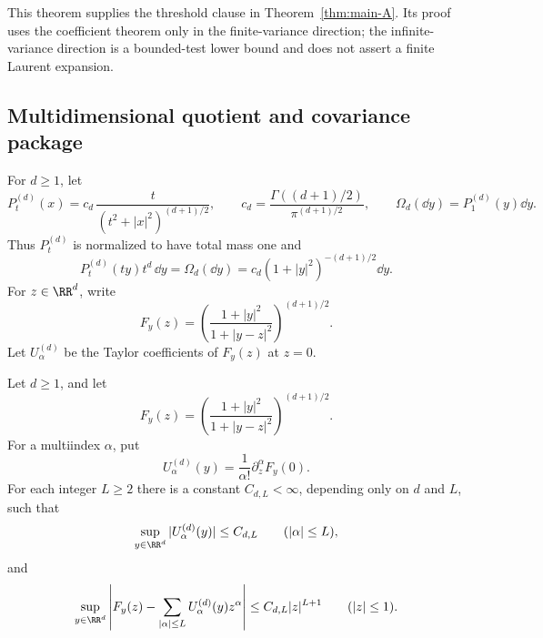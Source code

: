 \begin{remark}
This theorem supplies the threshold clause in Theorem~\ref{thm:main-A}.
Its proof uses the coefficient theorem only in the finite-variance direction;
the infinite-variance direction is a bounded-test lower bound and does not
assert a finite Laurent expansion.
\end{remark}

\subsection{Multidimensional quotient and covariance package}

For \(d\ge1\), let
\[
P_t^{(d)}(x)=c_d\,\frac{t}{(t^2+|x|^2)^{(d+1)/2}},
\qquad
c_d=\frac{\Gamma((d+1)/2)}{\pi^{(d+1)/2}},
\qquad
\Omega_d(\dd y)=P_1^{(d)}(y)\dd y.
\]
Thus \(P_t^{(d)}\) is normalized to have total mass one and
\[
P_t^{(d)}(ty)t^d\,\dd y=\Omega_d(\dd y)
=c_d(1+|y|^2)^{-(d+1)/2}\dd y .
\]
For \(z\in\RR^d\), write
\[
F_y(z)=\left(\frac{1+|y|^2}{1+|y-z|^2}\right)^{(d+1)/2}.
\]
Let \(U_\alpha^{(d)}\) be the Taylor coefficients of \(F_y(z)\) at \(z=0\).

\begin{lemma}%
\label{lem:local-multidim-quotient-taylor-remainder-core}
Let \(d\ge1\), and let
\[
F_y(z)=\left(\frac{1+|y|^2}{1+|y-z|^2}\right)^{(d+1)/2}.
\]
For a multiindex \(\alpha\), put
\[
U_\alpha^{(d)}(y)=\frac1{\alpha!}\partial_z^\alpha F_y(0).
\]
For each integer \(L\ge2\) there is a constant \(C_{d,L}<\infty\),
depending only on \(d\) and \(L\), such that
\begin{equation}\label{eq:local-multidim-coefficient-bound}
\sup_{y\in\RR^d}|U_\alpha^{(d)}(y)|\le C_{d,L}
\qquad (|\alpha|\le L),
\end{equation}
and
\begin{equation}\label{eq:local-multidim-taylor-remainder}
\sup_{y\in\RR^d}\left|
F_y(z)-\sum_{|\alpha|\le L}U_\alpha^{(d)}(y)z^\alpha
\right|
\le C_{d,L}|z|^{L+1}
\qquad (|z|\le1).
\end{equation}
\end{lemma}

